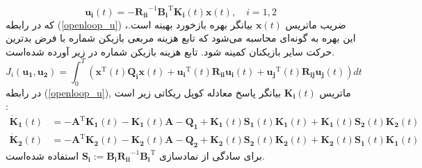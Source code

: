 \begin{equation}\label{openloop_u}
	\boldsymbol{u_i}(t) = -\boldsymbol{R_{ii}}^{-1}\boldsymbol{B_i}^\mathrm{T}\boldsymbol{K_{i}}(t)\boldsymbol{x}(t),\quad i = 1, 2
\end{equation}
که در رابطه 
(\ref{openloop_u})
،ضریب ماتریس $\boldsymbol{x}(t)$ بیانگر بهره بازخورد بهینه است. این بهره به گونه‌ای محاسبه می‌شود که تابع هزینه مربعی بازیکن شماره  با فرض بدترین حرکت سایر بازیکنان کمینه شود. تابع هزینه بازیکن شماره  در زیر آورده شده‌است.
 \begin{equation}
	J_i( \boldsymbol{u_1},  \boldsymbol{u_2}) = \int_{0}^{T}\left( \boldsymbol{x} ^\mathrm{T}(t) \boldsymbol{Q_i} \boldsymbol{x}(t)+
	\boldsymbol{u_i} ^\mathrm{T}(t) \boldsymbol{R_{ii}} \boldsymbol{u_i}(t)+
	\boldsymbol{u_j} ^\mathrm{T}(t)\boldsymbol{ R_{ij} u_j}(t)
	\right)dt
\end{equation}
در رابطه 
(\ref{openloop_u}),
ماتریس $\boldsymbol{K_{i}}(t)$ بیانگر پاسخ معادله کوپل ریكاتی
 زیر است
 \cite{diff_game}:
\begin{equation}\label{coupled_riccatti_LQDG}
\begin{split}
	\boldsymbol{\dot{K}_1}(t) &= -\boldsymbol{A}^\mathrm{T}\boldsymbol{K_1}(t) - \boldsymbol{K_1}(t)\boldsymbol{A} - \boldsymbol{Q_1} +\boldsymbol{K_1}(t)\boldsymbol{S_1}(t)\boldsymbol{K_1}(t) + \boldsymbol{K_1}(t)\boldsymbol{S_2}(t)\boldsymbol{K_2}(t)\\
	\boldsymbol{\dot{K}_2}(t) &= -\boldsymbol{A}^\mathrm{T}\boldsymbol{K_2}(t) - \boldsymbol{K_2}(t)\boldsymbol{A} - \boldsymbol{Q_2} +\boldsymbol{K_2}(t)\boldsymbol{S_2}(t)\boldsymbol{K_2}(t) + \boldsymbol{K_2}(t)\boldsymbol{S_1}(t)\boldsymbol{K_1}(t)
\end{split}
\end{equation}
برای سادگی از نمادسازی
$\boldsymbol{S_i} := \boldsymbol{B_iR_{ii}}^{-1}\boldsymbol{B_i}^\mathrm{T}$
  استفاده شده‌است. 


